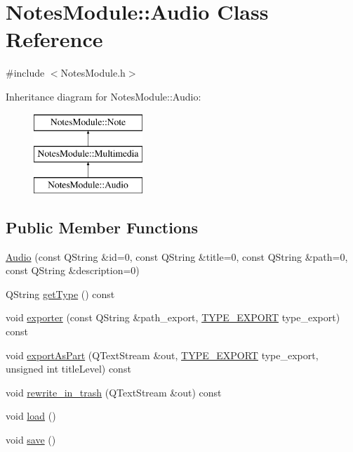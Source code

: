 \hypertarget{class_notes_module_1_1_audio}{\section{Notes\-Module\-:\-:Audio Class Reference}
\label{class_notes_module_1_1_audio}
}


{\ttfamily \#include $<$Notes\-Module.\-h$>$}

Inheritance diagram for Notes\-Module\-:\-:Audio\-:\begin{figure}[H]
\begin{center}
\leavevmode
\includegraphics[height=3.000000cm]{class_notes_module_1_1_audio}
\end{center}
\end{figure}
\subsection*{Public Member Functions}
\begin{DoxyCompactItemize}
\item 
\hyperlink{class_notes_module_1_1_audio_a34c82ee2f4c759fd76461dae3f9489b1}{Audio} (const Q\-String \&id=0, const Q\-String \&title=0, const Q\-String \&path=0, const Q\-String \&description=0)
\item 
Q\-String \hyperlink{class_notes_module_1_1_audio_a1965156d73964bb36e048e4d62ab6896}{get\-Type} () const 
\item 
void \hyperlink{class_notes_module_1_1_audio_aa2e00c1faf2da13f589f6537700f768b}{exporter} (const Q\-String \&path\-\_\-export, \hyperlink{_t_y_p_e_s___e_x_p_o_r_t_8h_a25a17d8584d83ab977791df2476e006c}{T\-Y\-P\-E\-\_\-\-E\-X\-P\-O\-R\-T} type\-\_\-export) const 
\item 
void \hyperlink{class_notes_module_1_1_audio_a6c0ddeda510f3234c3ad7a955af766a4}{export\-As\-Part} (Q\-Text\-Stream \&out, \hyperlink{_t_y_p_e_s___e_x_p_o_r_t_8h_a25a17d8584d83ab977791df2476e006c}{T\-Y\-P\-E\-\_\-\-E\-X\-P\-O\-R\-T} type\-\_\-export, unsigned int title\-Level) const 
\item 
void \hyperlink{class_notes_module_1_1_audio_a2a09d27cb51e70f78e36f4aaf08a3029}{rewrite\-\_\-in\-\_\-trash} (Q\-Text\-Stream \&out) const 
\item 
void \hyperlink{class_notes_module_1_1_audio_a2f65a901b55b2a1a00e49ace39fc6761}{load} ()
\item 
void \hyperlink{class_notes_module_1_1_audio_a0555ff1d4cba12ea17b7a76465682367}{save} ()
\end{DoxyCompactItemize}
